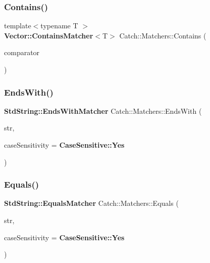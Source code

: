 \mbox{\label{namespace_catch_1_1_matchers_a4b3621740dc515216ad31ab827d4092c}} 
\subsubsection{Contains()\hspace{0.1cm}{\footnotesize\ttfamily [2/2]}}
{\footnotesize\ttfamily template$<$typename T $>$ \\
\textbf{ Vector\+::\+Contains\+Matcher}$<$T$>$ Catch\+::\+Matchers\+::\+Contains (\begin{DoxyParamCaption}\item[{std\+::vector$<$ T $>$ const \&}]{comparator }\end{DoxyParamCaption})}

\mbox{\label{namespace_catch_1_1_matchers_ae5a45efb4538c57c43e04f3f9043ad6e}} 
\subsubsection{Ends\+With()}
{\footnotesize\ttfamily \textbf{ Std\+String\+::\+Ends\+With\+Matcher} Catch\+::\+Matchers\+::\+Ends\+With (\begin{DoxyParamCaption}\item[{std\+::string const \&}]{str,  }\item[{\textbf{ Case\+Sensitive\+::\+Choice}}]{case\+Sensitivity = {\ttfamily \textbf{ Case\+Sensitive\+::\+Yes}} }\end{DoxyParamCaption})}

\mbox{\label{namespace_catch_1_1_matchers_af8af7dfc338335ed4c788cb1b37fc59f}} 
\subsubsection{Equals()\hspace{0.1cm}{\footnotesize\ttfamily [1/2]}}
{\footnotesize\ttfamily \textbf{ Std\+String\+::\+Equals\+Matcher} Catch\+::\+Matchers\+::\+Equals (\begin{DoxyParamCaption}\item[{std\+::string const \&}]{str,  }\item[{\textbf{ Case\+Sensitive\+::\+Choice}}]{case\+Sensitivity = {\ttfamily \textbf{ Case\+Sensitive\+::\+Yes}} }\end{DoxyParamCaption})}

